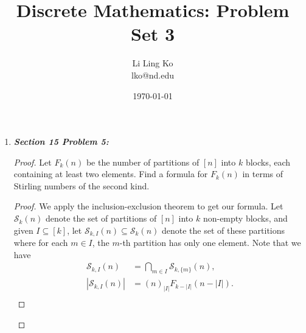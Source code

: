 \documentclass{article}
\begin{document}
\title{Discrete Mathematics: Problem Set 3}
\author{Li Ling Ko\\ lko@nd.edu}
\date{\today}
\maketitle

\begin{enumerate}[label={\bf Q\arabic*:}]
  \item \it \textbf{Section 15 Problem 5:}
    \begin{proof}
      Let $F_k(n)$ be the number of partitions of $[n]$ into $k$ blocks,
      each containing at least two elements. Find a formula for $F_k(n)$ in
      terms of Stirling numbers of the second kind.

      \begin{proof}
        We apply the inclusion-exclusion theorem to get our formula.
        Let $\mathcal{S}_k(n)$ denote the set of partitions of $[n]$ into
        $k$ non-empty blocks, and given $I\subseteq[k]$, let
        $\mathcal{S}_{k,I}(n)\subseteq \mathcal{S}_k(n)$ denote the set of
        these partitions where for each $m\in I$, the $m$-th partition has
        only one element. Note that we have
        \begin{align*}
          \mathcal{S}_{k,I}(n) &=\bigcap_{m\in I} \mathcal{S}_{k,\{m\}}(n),\\
          |\mathcal{S}_{k,I}(n)| &=(n)_{|I|} F_{k-|I|}(n-|I|).\\
        \end{align*}


\end{proof}
\end{proof}
\end{enumerate}
\end{document}
